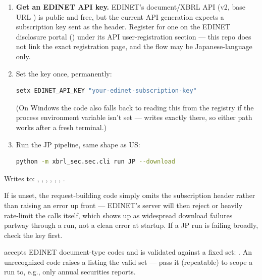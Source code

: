 \documentclass[11pt]{article}
\begin{document}
\begin{enumerate}
  \item \textbf{Get an EDINET API key.} EDINET's document/XBRL API (v2, base URL
        ) is public and free, but the current
        API generation expects a subscription key sent as the
         header. Register for one on the EDINET
        disclosure portal () under its API
        user-registration section --- this repo does not link the exact registration
        page, and the flow may be Japanese-language only.
  \item Set the key once, permanently:
\begin{lstlisting}[language=bash]
setx EDINET_API_KEY "your-edinet-subscription-key"
\end{lstlisting}
        (On Windows the code also falls back to reading this from the registry
         if the process environment variable isn't
        set ---  writes exactly there, so either path works after a fresh
        terminal.)
  \item Run the JP pipeline, same shape as US:
\begin{lstlisting}[language=bash]
python -m xbrl_sec.sec.cli run JP --download
\end{lstlisting}
\end{enumerate}

Writes to: , , ,
, , , .

\begin{notebox}
If  is unset, the request-building code simply omits the
subscription header rather than raising an error up front --- EDINET's server will then
reject or heavily rate-limit the calls itself, which shows up as widespread download
failures partway through a run, not a clean error at startup. If a JP run is failing
broadly, check the key first.
\end{notebox}

\begin{specbox}
\;
 accepts EDINET document-type codes and is validated against a fixed
set: . An unrecognized code
raises a  listing the valid set --- pass it (repeatable) to scope a run
to, e.g., only annual securities reports.
\end{specbox}
\end{document}
